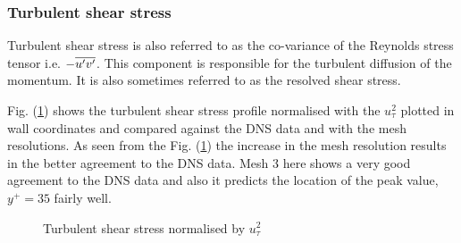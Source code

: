 \subsubsection{Turbulent shear stress}
Turbulent shear stress is also referred to as the co-variance of the Reynolds stress tensor i.e. $-\overline{{u}^\prime{v}^\prime}$. This component is responsible for the turbulent diffusion of the momentum. It is also sometimes referred to as the resolved shear stress. 

Fig. (\ref{uvrms udns}) shows the turbulent shear stress profile normalised with the $u_\tau^2$ plotted in wall coordinates and compared against the DNS data and with the mesh resolutions. As seen from the Fig. (\ref{uvrms udns}) the increase in the mesh resolution results in the better agreement to the DNS data. Mesh 3 here shows a very good agreement to the DNS data and also it predicts the location of the peak value, $y^+ = 35$ fairly well.

\begin{figure}[h]
\begin{minipage}[b]{0.5\textwidth}
\end{minipage}
%
\begin{minipage}[b]{0.5\textwidth}
\end{minipage}
\caption{Turbulent shear stress normalised by $u_\tau^2$}
\label{uvrms udns}
\end{figure}

